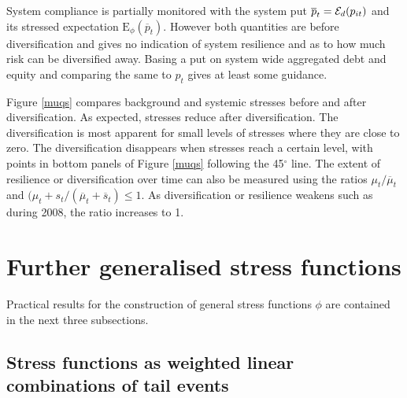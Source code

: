 \documentclass[authoryear]{elsarticle}
\newcommand{\E}{\mathrm{E}}
\newcommand{\Ex}{{\cal E}}
\newcommand{\Exd}{\Ex_d}
\newcommand{\Es}{\E_\phi}
\newcommand{\bi}{\begin{itemize}}
\newcommand{\ei}{\end{itemize}}
\renewcommand{\i}{\item}
\newcommand{\fref}[1]{Figure \ref{#1}}
\renewcommand{\P}{\mathrm{P}}
\begin{document}
System compliance is partially monitored with the system put $\overline p_t=\Exd(p_{it})$ and its stressed expectation $\Es(\overline p_t)$. However both quantities are before diversification and gives no indication of system resilience and as to how much risk can be diversified away. Basing a put on system wide aggregated debt and equity and comparing the same to $p_t$  gives at least some guidance.

\fref{muqs} compares background and systemic stresses before and after diversification. As expected, stresses reduce after diversification. The diversification is most apparent for small levels of stresses where they are close to zero. The diversification disappears when stresses reach a certain level, with points in bottom panels of \fref{muqs} following the 45$^\circ$ line. The extent of resilience or diversification over time can also be measured using the ratios $\mu_t/\overline \mu_t$ and $(\mu_t+s_t/(\overline \mu_t+\overline s_t)\le 1$. As diversification or resilience weakens such as during 2008, the ratio increases to 1.

 \section{Further generalised stress functions}\label{genstress}

Practical results for the  construction of general stress functions $\phi$ are contained in the next three subsections.


 \subsection{Stress functions as  weighted linear combinations of tail events}
\end{document}
